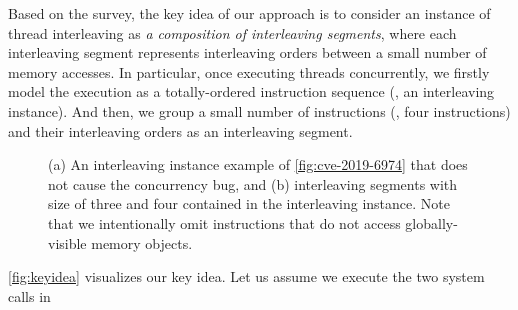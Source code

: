 %
Based on the survey, the key idea of our approach is to consider an
instance of thread interleaving as \textit{a composition of
  interleaving segments}, where each interleaving segment represents
interleaving orders between a small number of memory accesses.
%
In particular, once executing threads concurrently, we firstly model
the execution as a totally-ordered instruction sequence (\ie, an
interleaving instance).
%
And then, we group a small number of instructions (\eg, four
instructions) and their interleaving orders as an interleaving segment.


\begin{figure}[t]
  \hfill
  \caption{(a) An interleaving instance example of
    \autoref{fig:cve-2019-6974} that does not cause the concurrency
    bug, and (b) interleaving segments with size of three and four
    contained in the interleaving instance. Note that we intentionally
    omit instructions that do not access globally-visible memory
    objects.}
  \label{fig:keyidea}
\end{figure}
%
\autoref{fig:keyidea} visualizes our key idea.
%
Let us assume we execute the two system calls in
